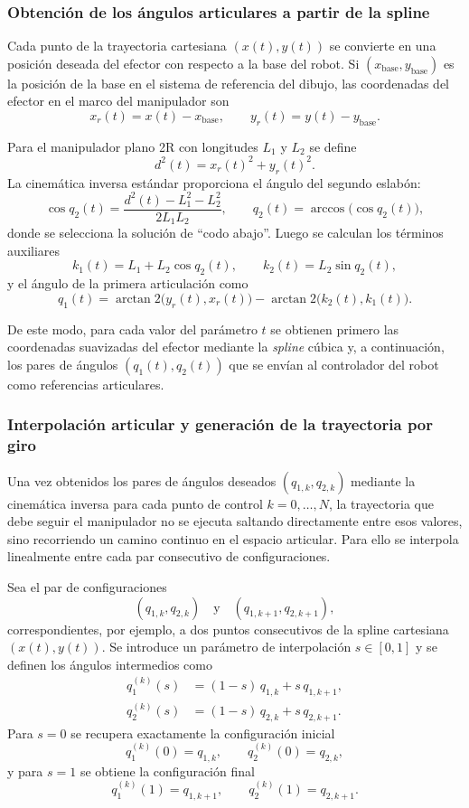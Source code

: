 \documentclass[11pt,a4paper]{article}
\begin{document}
\subsubsection{Obtención de los ángulos articulares a partir de la spline}

Cada punto de la trayectoria cartesiana $(x(t),y(t))$ se convierte en una posición deseada del efector con respecto a la base del robot.  
Si $(x_\text{base},y_\text{base})$ es la posición de la base en el sistema de referencia del dibujo, las coordenadas del efector en el marco del manipulador son
\[
x_r(t) = x(t) - x_\text{base}, \qquad
y_r(t) = y(t) - y_\text{base}.
\]

Para el manipulador plano 2R con longitudes $L_1$ y $L_2$ se define
\[
d^2(t) = x_r(t)^2 + y_r(t)^2.
\]
La cinemática inversa estándar proporciona el ángulo del segundo eslabón:
\[
\cos q_2(t) = \frac{d^2(t) - L_1^2 - L_2^2}{2 L_1 L_2},
\qquad
q_2(t) = \arccos\bigl(\cos q_2(t)\bigr),
\]
donde se selecciona la solución de ``codo abajo''.  
Luego se calculan los términos auxiliares
\[
k_1(t) = L_1 + L_2 \cos q_2(t), \qquad
k_2(t) = L_2 \sin q_2(t),
\]
y el ángulo de la primera articulación como
\[
q_1(t) = \arctan2\!\bigl(y_r(t),x_r(t)\bigr)
          - \arctan2\!\bigl(k_2(t),k_1(t)\bigr).
\]

De este modo, para cada valor del parámetro $t$ se obtienen primero las coordenadas suavizadas del efector mediante la \emph{spline} cúbica y, a continuación, los pares de ángulos $(q_1(t),q_2(t))$ que se envían al controlador del robot como referencias articulares.

\subsubsection{Interpolación articular y generación de la trayectoria por giro}

Una vez obtenidos los pares de ángulos deseados $(q_{1,k},q_{2,k})$ mediante la cinemática inversa para cada punto de control $k=0,\dots,N$, la trayectoria que debe seguir el manipulador no se ejecuta saltando directamente entre esos valores, sino recorriendo un camino continuo en el espacio articular. Para ello se interpola linealmente entre cada par consecutivo de configuraciones.

Sea el par de configuraciones
\[
(q_{1,k},q_{2,k}) \quad\text{y}\quad (q_{1,k+1},q_{2,k+1}),
\]
correspondientes, por ejemplo, a dos puntos consecutivos de la spline cartesiana $(x(t),y(t))$. Se introduce un parámetro de interpolación $s\in[0,1]$ y se definen los ángulos intermedios como
\begin{align}
q_1^{(k)}(s) &= (1-s)\,q_{1,k} + s\,q_{1,k+1}, \label{eq:q1_interp_cont}\\
q_2^{(k)}(s) &= (1-s)\,q_{2,k} + s\,q_{2,k+1}. \label{eq:q2_interp_cont}
\end{align}
Para $s=0$ se recupera exactamente la configuración inicial
\[
q_1^{(k)}(0)=q_{1,k},\qquad q_2^{(k)}(0)=q_{2,k},
\]
y para $s=1$ se obtiene la configuración final
\[
q_1^{(k)}(1)=q_{1,k+1},\qquad q_2^{(k)}(1)=q_{2,k+1}.
\]
\end{document}
